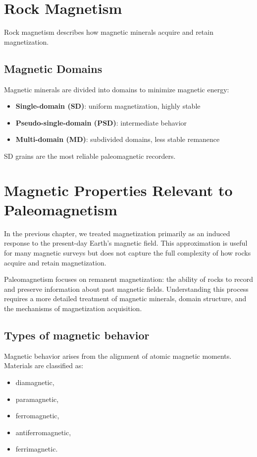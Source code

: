 \section{Rock Magnetism}

Rock magnetism describes how magnetic minerals acquire and retain magnetization.

\subsection{Magnetic Domains}

Magnetic minerals are divided into domains to minimize magnetic energy:
\begin{itemize}
\item \textbf{Single-domain (SD)}: uniform magnetization, highly stable
\item \textbf{Pseudo-single-domain (PSD)}: intermediate behavior
\item \textbf{Multi-domain (MD)}: subdivided domains, less stable remanence
\end{itemize}

SD grains are the most reliable paleomagnetic recorders.

\section{Magnetic Properties Relevant to Paleomagnetism}

In the previous chapter, we treated magnetization primarily as an induced response to the present-day Earth's magnetic field. This approximation is useful for many magnetic surveys but does not capture the full complexity of how rocks acquire and retain magnetization.

Paleomagnetism focuses on remanent magnetization: the ability of rocks to record and preserve information about past magnetic fields. Understanding this process requires a more detailed treatment of magnetic minerals, domain structure, and the mechanisms of magnetization acquisition.

\subsection{Types of magnetic behavior}

Magnetic behavior arises from the alignment of atomic magnetic moments. Materials are classified as:
\begin{itemize}
    \item diamagnetic,
    \item paramagnetic,
    \item ferromagnetic,
    \item antiferromagnetic,
    \item ferrimagnetic.
\end{itemize}

